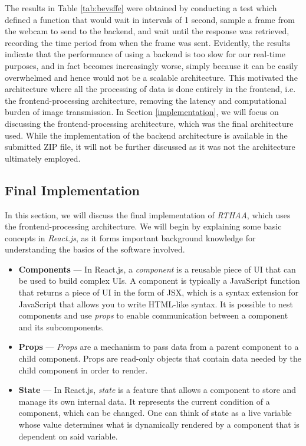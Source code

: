 \documentclass[12pt, a4paper]{article}
\begin{document}
The results in Table \ref{tab:bevsffe} were obtained by conducting a test which defined a function that would wait in intervals of 1 second, sample a frame from the webcam to send to the backend, and wait until the response was retrieved, recording the time period from when the frame was sent. Evidently, the results indicate that the performance of using a backend is too slow for our real-time purposes, and in fact becomes increasingly worse, simply because it can be easily overwhelmed and hence would not be a scalable architecture. This motivated the architecture where all the processing of data is done entirely in the frontend, i.e. the frontend-processing architecture, removing the latency and computational burden of image transmission. In Section \ref{implementation}, we will focus on discussing the frontend-processing architecture, which was the final architecture used. While the implementation of the backend architecture is available in the submitted ZIP file, it will not be further discussed as it was not the architecture ultimately employed.

\subsection{Final Implementation}
\label{finalimp}

In this section, we will discuss the final implementation of \textit{RTHAA}, which uses the frontend-processing architecture. We will begin by explaining some basic concepts in \textit{React.js}, as it forms important background knowledge for understanding the basics of the software involved.
\begin{itemize}

    \item \textbf{Components} --- In React.js, a \textit{component} is a reusable piece of UI that can be used to build complex UIs. A component is typically a JavaScript function that returns a piece of UI in the form of JSX, which is a syntax extension for JavaScript that allows you to write HTML-like syntax. It is possible to nest components and use \textit{props} to enable communication between a component and its subcomponents.
    
    \item \textbf{Props} --- \textit{Props} are a mechanism to pass data from a parent component to a child component. Props are read-only objects that contain data needed by the child component in order to render.
    
    \item \textbf{State} --- In React.js, \textit{state} is a feature that allows a component to store and manage its own internal data. It represents the current condition of a component, which can be changed. One can think of state as a live variable whose value determines what is dynamically rendered by a component that is dependent on said variable. 

\end{itemize}
\end{document}
